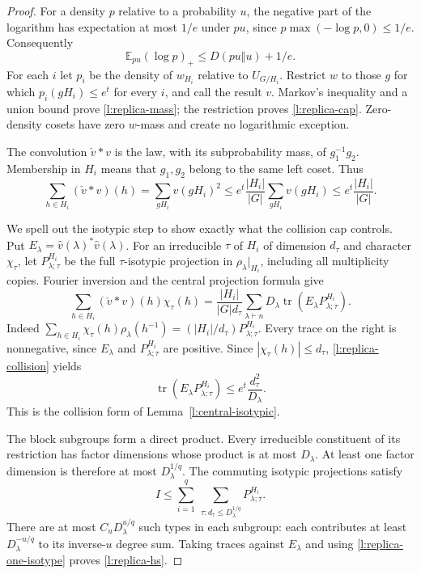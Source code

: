 \begin{proof}
For a density $p$ relative to a probability $u$, the negative part of
the logarithm has expectation at most $1/e$ under $pu$, since
$p\max(-\log p,0)\le1/e$.  Consequently
\[
 \mathbb E_{pu}(\log p)_+\le D(pu\Vert u)+1/e.
\]
For each $i$ let $p_i$ be the density of $w_{H_i}$ relative to
$U_{G/H_i}$.  Restrict $w$ to those $g$ for which
$p_i(gH_i)\le e^t$ for every $i$, and call the result $v$.
Markov's inequality and a union bound prove \eqref{l:replica-mass};
the restriction proves \eqref{l:replica-cap}.  Zero-density cosets
have zero $w$-mass and create no logarithmic exception.

The convolution $\check v*v$ is the law, with its subprobability
mass, of $g_1^{-1}g_2$.  Membership in $H_i$ means that $g_1,g_2$
belong to the same left coset.  Thus
\[
 \sum_{h\in H_i}(\check v*v)(h)
 =\sum_{gH_i}v(gH_i)^2
 \le e^t\frac{|H_i|}{|G|}\sum_{gH_i}v(gH_i)
 \le e^t\frac{|H_i|}{|G|}.
\]

We spell out the isotypic step to show exactly what the collision cap
controls.  Put $E_\lambda=\widehat v(\lambda)^*\widehat v(\lambda)$.
For an irreducible $\tau$ of $H_i$ of dimension $d_\tau$ and
character $\chi_\tau$, let $P_{\lambda;\tau}^{H_i}$ be the full
$\tau$-isotypic projection in $\rho_\lambda|_{H_i}$, including all
multiplicity copies.  Fourier inversion and the central projection
formula give
\begin{equation}\label{l:replica-isotypic-identity}
 \sum_{h\in H_i}(\check v*v)(h)\chi_\tau(h)
 =\frac{|H_i|}{|G|d_\tau}
   \sum_{\lambda\vdash n}D_\lambda
         \operatorname{tr}(E_\lambda P_{\lambda;\tau}^{H_i}).
\end{equation}
Indeed $\sum_{h\in H_i}\chi_\tau(h)\rho_\lambda(h^{-1})
=(|H_i|/d_\tau)P_{\lambda;\tau}^{H_i}$.
Every trace on the right is nonnegative, since $E_\lambda$ and
$P_{\lambda;\tau}^{H_i}$ are positive.  Since
$|\chi_\tau(h)|\le d_\tau$, \eqref{l:replica-collision} yields
\begin{equation}\label{l:replica-one-isotype}
 \operatorname{tr}(E_\lambda P_{\lambda;\tau}^{H_i})
       \le e^t\frac{d_\tau^2}{D_\lambda}.
\end{equation}
This is the collision form of Lemma~\ref{l:central-isotypic}.

The block subgroups form a direct product.  Every irreducible
constituent of its restriction has factor dimensions whose product
is at most $D_\lambda$.  At least one factor dimension is therefore
at most $D_\lambda^{1/q}$.  The commuting isotypic projections satisfy
\[
 I\le\sum_{i=1}^q\ \sum_{\tau:d_\tau\le D_\lambda^{1/q}}
                      P_{\lambda;\tau}^{H_i}.
\]
There are at most $C_uD_\lambda^{u/q}$ such types in each subgroup:
each contributes at least $D_\lambda^{-u/q}$ to its inverse-$u$
degree sum.  Taking traces against $E_\lambda$ and using
\eqref{l:replica-one-isotype} proves \eqref{l:replica-hs}.
\end{proof}


